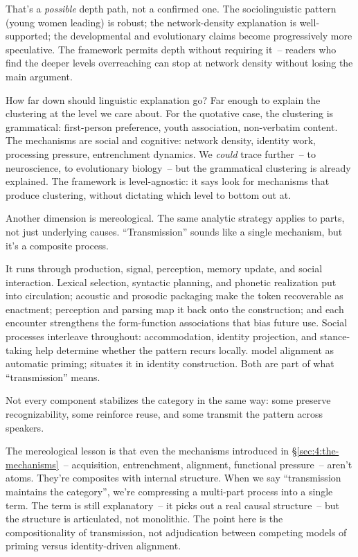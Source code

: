 That's a \emph{possible} depth path, not a confirmed one. The sociolinguistic pattern (young women leading) is robust; the network-density explanation is well-supported; the developmental and evolutionary claims become progressively more speculative. The framework permits depth without requiring it~-- readers who find the deeper levels overreaching can stop at network density without losing the main argument.

How far down should linguistic explanation go? Far enough to explain the clustering at the level we care about. For the quotative case, the clustering is grammatical: first-person preference, youth association, non-verbatim content. The mechanisms are social and cognitive: network density, identity work, processing pressure, entrenchment dynamics. We \emph{could} trace further~-- to neuroscience, to evolutionary biology~-- but the grammatical clustering is already explained. The framework is level-agnostic: it says look for mechanisms that produce clustering, without dictating which level to bottom out at.

Another dimension is mereological. The same analytic strategy applies to parts, not just underlying causes. \enquote{Transmission} sounds like a single mechanism, but it's a composite process.

It runs through production, signal, perception, memory update, and social interaction. Lexical selection, syntactic planning, and phonetic realization put  into circulation; acoustic and prosodic packaging make the token recoverable as enactment; perception and parsing map it back onto the construction; and each encounter strengthens the form-function associations that bias future use. Social processes interleave throughout: accommodation, identity projection, and stance-taking help determine whether the pattern recurs locally. \textcite{pickering2004} model alignment as automatic priming; \textcite{Eckert2012} situates it in identity construction. Both are part of what \enquote{transmission} means.

Not every component stabilizes the category in the same way: some preserve recognizability, some reinforce reuse, and some transmit the pattern across speakers.

The mereological lesson is that even the mechanisms introduced in §\ref{sec:4:the-mechanisms}~-- acquisition, entrenchment, alignment, functional pressure~-- aren't atoms. They're composites with internal structure. When we say \enquote{transmission maintains the category}, we're compressing a multi-part process into a single term. The term is still explanatory~-- it picks out a real causal structure~-- but the structure is articulated, not monolithic. The point here is the compositionality of transmission, not adjudication between competing models of priming versus identity-driven alignment.

